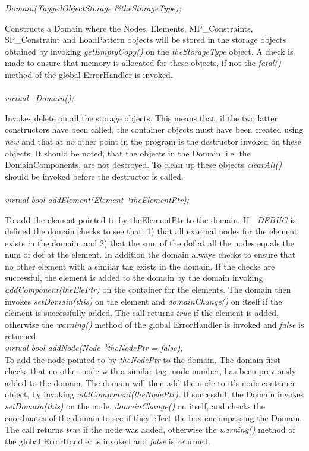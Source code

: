 {\em Domain(TaggedObjectStorage \&theStorageType); } 

Constructs a Domain where the Nodes, Elements, MP\_Constraints,
SP\_Constraint and LoadPattern objects will be stored in the storage
objects obtained by invoking {\em getEmptyCopy()} on the {\em
theStorageType} object. A check is made to ensure that memory is
allocated for these objects, if not the {\em fatal()} method of the
global ErrorHandler is invoked.\\    

  \\
{\em virtual~ $\tilde{}$Domain();}  

Invokes delete on all the storage objects. This means that, if the two
latter constructors have been called, the container objects must have 
been created using {\em new} and that at no other point in the program
is the destructor invoked on these objects. It should be noted, that
the objects in the Domain, i.e. the DomainComponents, are not
destroyed. To clean up these objects {\em clearAll()} should be
invoked before the destructor is called. \\

  \\
{\em virtual bool addElement(Element *theElementPtr);}  

To add the element pointed to by theElementPtr to the domain. 
If {\em \_DEBUG} is defined the domain checks to
see that: 1) that all external nodes for the element exists in the
domain. and 2) that the sum of the dof at all the nodes equals the num
of dof at the element. In addition the domain always checks to ensure
that no other element with a similar tag exists in the domain.
If the checks are successful, the element is added to
the domain by the domain invoking {\em addComponent(theElePtr)} on
the container for the elements. The domain then invokes {\em
setDomain(this)} on the element and {\em domainChange()} on
itself if the element is successfully added. The call returns {\em
true} if the element is added, otherwise the {\em warning()} method of
the global ErrorHandler is invoked and {\em false} is returned.\\

{\em virtual bool addNode(Node *theNodePtr = false);}  \\
To add the node pointed to by {\em theNodePtr} to the domain. 
The domain first checks that no other node with a similar tag,
node number, has been previously added to the domain. The
domain will then add the node to it's node container object, by
invoking {\em addComponent(theNodePtr)}. If successful, the Domain
invokes {\em setDomain(this)} on the node, {\em domainChange()} on
itself, and checks the coordinates of the domain to see if they effect
the box encompassing the Domain. The call returns {\em true} if the
node was added, otherwise the {\em warning()} method of
the global ErrorHandler is invoked and {\em false} is returned.\\


